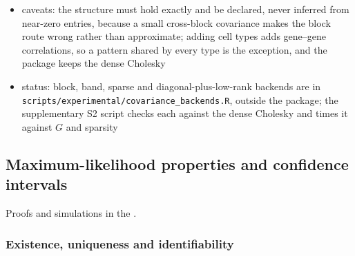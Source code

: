 \begin{itemize}
  \item caveats: the structure must hold exactly and be declared, never inferred from near-zero entries, because a small
        cross-block covariance makes the block route wrong rather than approximate; adding cell types adds gene--gene
        correlations, so a pattern shared by every type is the exception, and the package keeps the dense Cholesky
  \item status: block, band, sparse and diagonal-plus-low-rank backends are in
        \texttt{scripts/experimental/covariance\_backends.R}, outside the package; the supplementary S2 script checks each
        against the dense Cholesky and times it against \(G\) and sparsity
\end{itemize}

\subsection{Maximum-likelihood properties and confidence intervals}
\label{app:mle}

Proofs and simulations in the .

\subsubsection{Existence, uniqueness and identifiability}

